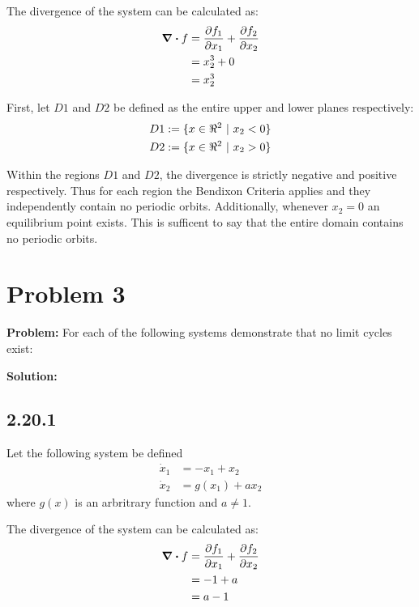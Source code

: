 \documentclass[letter]{article}
\begin{document}
The divergence of the system can be calculated as:
\begin{align}
	\div f  &= \pdv{f_1}{x_1} + \pdv{f_2}{x_2} \nonumber\\
	&= x_2^3 + 0 \nonumber\\
	&= x_2^3
\end{align}

First, let $D1$ and $D2$ be defined as the entire upper and lower planes respectively:
\begin{equation}
	\begin{aligned}
		D1 &:= \{x \in \real^2 \ | \ x_2 < 0\}\\
		D2 &:= \{x \in \real^2 \ | \ x_2 > 0\}
	\end{aligned}
\end{equation}

Within the regions $D1$ and $D2$, the divergence is strictly negative and positive respectively. Thus for each region the Bendixon Criteria applies and they independently contain no periodic orbits.
Additionally, whenever $x_2 = 0$ an equilibrium point exists. This is sufficent to say that the entire domain contains no periodic orbits.



\newpage
\section{Problem 3}
\textbf{Problem:}
For each of the following systems demonstrate that no limit cycles exist:

\noindent
\textbf{Solution:}
\subsection{2.20.1}
Let the following system be defined
\begin{equation}
	\begin{aligned}
		\dot{x}_1 &= -x_1 + x_2\\
		\dot{x}_2 &= g(x_1) + a x_2
	\end{aligned}
\end{equation}
where $g(x)$ is an arbritrary function and $a \neq 1$.

The divergence of the system can be calculated as:
\begin{align}
	\div f  &= \pdv{f_1}{x_1} + \pdv{f_2}{x_2} \nonumber\\
	&= -1 + a\\
	&= a - 1
\end{align}
\end{document}
